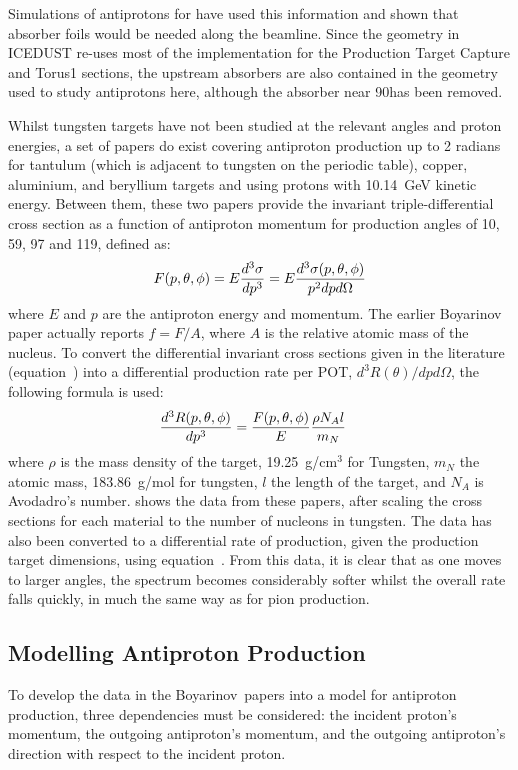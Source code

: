 Simulations of antiprotons for \phaseI have used this information and shown that absorber foils would be needed along the beamline.  
Since the \phaseII geometry in ICEDUST re-uses most of the implementation for the Production Target Capture and Torus1 sections, the upstream absorbers are also contained in the geometry used to study antiprotons here,
although the absorber near 90\degree has been removed.

\FigAntiprotonData
Whilst tungsten targets have not been studied at the relevant angles and proton energies, a set of papers \cite{Boyarinov:1994tp,Kiselev:2012sj} do exist covering antiproton production up to 2 radians for tantulum (which is adjacent to tungsten on the periodic table), copper, aluminium, and beryllium targets and using protons with 10.14~GeV kinetic energy.
Between them, these two papers provide the invariant triple-differential cross section as a function of antiproton momentum for production angles of 10, 59, 97 and 119\degree, defined as:
\begin{equation}
\eqlabel{bg:antiprotons:lit}
	F(p,\theta,\phi)=E \frac{d^3\sigma}{dp^3}=E\frac{d^3\sigma(p,\theta,\phi)}{p^2dpd\Omega}
\end{equation}
where $E$ and $p$ are the antiproton energy and momentum.  The earlier Boyarinov paper actually reports $f=F/A$, where $A$ is the relative atomic mass of the nucleus.
To convert the differential invariant cross sections given in the literature (equation~) into a differential production rate per \ac{POT}, $d^3R(\theta)/dpd\Omega$, the following formula is used:
\begin{align}
	\eqlabel{bg:antiprotons:rate}
	\frac{d^3R(p,\theta,\phi)}{dp^3}&=\frac{F(p,\theta,\phi)}{E}\frac{\rho N_A l}{m_N}
\end{align}
where $\rho$ is the mass density of the target, 19.25~g/cm$^3$ for Tungsten, $m_N$ the atomic mass, 183.86~g/mol for tungsten, $l$ the length of the target, and $N_A$ is Avodadro's number.
 shows the data from these papers, after scaling the cross sections for each material to the number of nucleons in tungsten.
The data has also been converted to a differential rate of production, given the \phaseII production target dimensions, using equation~.
From this data, it is clear that as one moves to larger angles, the spectrum becomes considerably softer whilst the overall rate falls quickly, in much the same way as for pion production.

\subsection{Modelling Antiproton Production}
To develop the data in the Boyarinov~\etal papers into a model for antiproton production, three dependencies must be considered:
the incident proton's momentum, the outgoing antiproton's momentum, and the outgoing antiproton's direction with respect to the incident proton.

